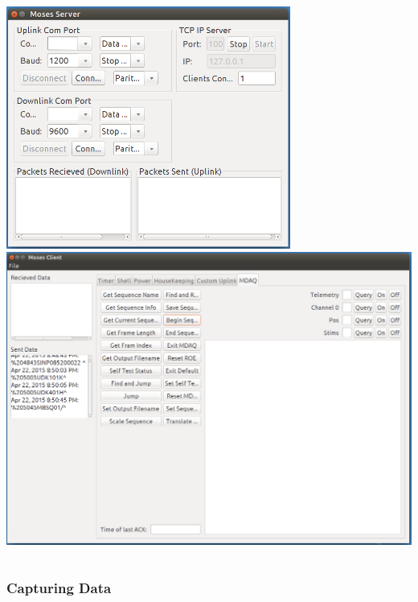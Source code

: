 \documentclass[landscape,xcolor={table}]{beamer}
\begin{document}
\begin{frame}
\begin{columns}[T]
\begin{column}{.45\textwidth}
			\includegraphics[width=0.7\textwidth]{server_scr} \\
			\includegraphics[width=\textwidth]{client_scr}
					
		\end{column}%
		\end{columns}

	\end{frame}
	
	\begin{frame}
		
		\frametitle{Capturing Data}

	\end{frame}
	
\end{document}
